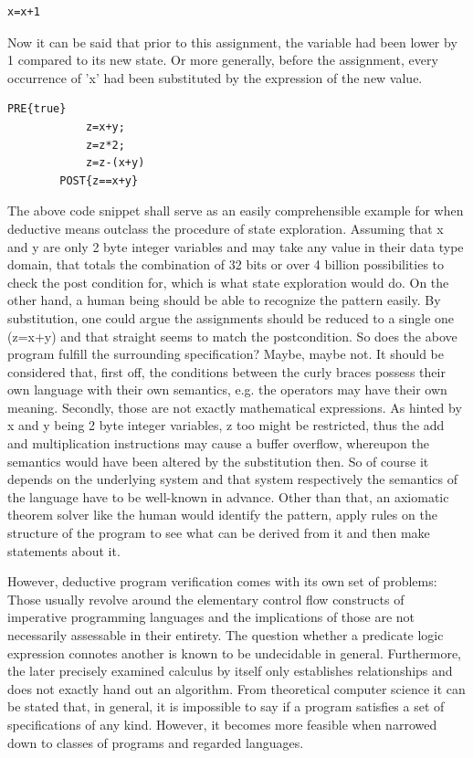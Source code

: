 \begin{center}
	\begin{lstlisting}[caption={First listing}]
		x=x+1
	\end{lstlisting}
\end{center}

Now it can be said that prior to this assignment, the variable had been lower by 1 compared to its new state. Or more generally, before the assignment, every occurrence of 'x' had been substituted by the expression of the new value.

\begin{center}
	\begin{lstlisting}[caption={Disadvantages of state-space exploration}]
		PRE{true}
			z=x+y;
			z=z*2;
			z=z-(x+y)
		POST{z==x+y}
	\end{lstlisting}
\end{center}

The above code snippet shall serve as an easily comprehensible example for when deductive means outclass the procedure of state exploration. Assuming that x and y are only 2 byte integer variables and may take any value in their data type domain, that totals the combination of 32 bits or over 4 billion possibilities to check the post condition for, which is what state exploration would do. On the other hand, a human being should be able to recognize the pattern easily. By substitution, one could argue the assignments should be reduced to a single one (z=x+y) and that straight seems to match the postcondition. So does the above program fulfill the surrounding specification? Maybe, maybe not. It should be considered that, first off, the conditions between the curly braces possess their own language with their own semantics, e.g. the operators may have their own meaning. Secondly, those are not exactly mathematical expressions. As hinted by x and y being 2 byte integer variables, z too might be restricted, thus the add and multiplication instructions may cause a buffer overflow, whereupon the semantics would have been altered by the substitution then. So of course it depends on the underlying system and that system respectively the semantics of the language have to be well-known in advance. Other than that, an axiomatic theorem solver like the human would identify the pattern, apply rules on the structure of the program to see what can be derived from it and then make statements about it.

However, deductive program verification comes with its own set of problems: Those usually revolve around the elementary control flow constructs of imperative programming languages and the implications of those are not necessarily assessable in their entirety. The question whether a predicate logic expression connotes another is known to be undecidable in general. Furthermore, the later precisely examined calculus by itself only establishes relationships and does not exactly hand out an algorithm. From theoretical computer science it can be stated that, in general, it is impossible to say if a program satisfies a set of specifications of any kind. However, it becomes more feasible when narrowed down to classes of programs and regarded languages.

